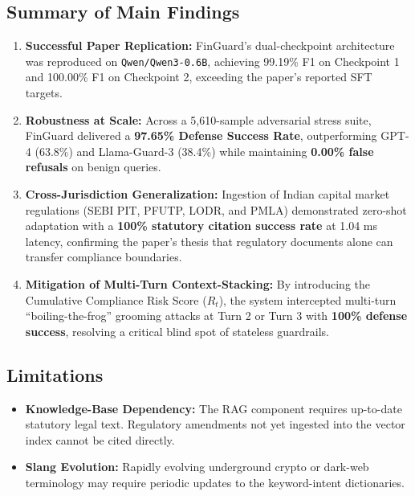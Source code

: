 \documentclass[11pt,a4paper]{article}
\begin{document}
\subsection{Summary of Main Findings}
\begin{enumerate}[noitemsep]
    \item \textbf{Successful Paper Replication:} FinGuard's dual-checkpoint architecture was reproduced on \texttt{Qwen/Qwen3-0.6B}, achieving 99.19\% F1 on Checkpoint 1 and 100.00\% F1 on Checkpoint 2, exceeding the paper's reported SFT targets.
    \item \textbf{Robustness at Scale:} Across a 5,610-sample adversarial stress suite, FinGuard delivered a \textbf{97.65\% Defense Success Rate}, outperforming GPT-4 (63.8\%) and Llama-Guard-3 (38.4\%) while maintaining \textbf{0.00\% false refusals} on benign queries.
    \item \textbf{Cross-Jurisdiction Generalization:} Ingestion of Indian capital market regulations (SEBI PIT, PFUTP, LODR, and PMLA) demonstrated zero-shot adaptation with a \textbf{100\% statutory citation success rate} at 1.04 ms latency, confirming the paper's thesis that regulatory documents alone can transfer compliance boundaries.
    \item \textbf{Mitigation of Multi-Turn Context-Stacking:} By introducing the Cumulative Compliance Risk Score ($R_t$), the system intercepted multi-turn ``boiling-the-frog'' grooming attacks at Turn 2 or Turn 3 with \textbf{100\% defense success}, resolving a critical blind spot of stateless guardrails.
\end{enumerate}

\subsection{Limitations}
\begin{itemize}[noitemsep]
    \item \textbf{Knowledge-Base Dependency:} The RAG component requires up-to-date statutory legal text. Regulatory amendments not yet ingested into the vector index cannot be cited directly.
    \item \textbf{Slang Evolution:} Rapidly evolving underground crypto or dark-web terminology may require periodic updates to the keyword-intent dictionaries.
\end{itemize}
\end{document}
